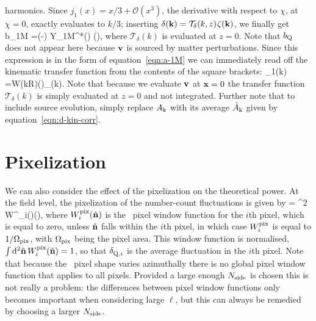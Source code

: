 harmonics.
Since $j_1(x)=x/3+\mathcal{O}(x^3)$, the derivative with respect to $\chi$, at $\chi=0$,
exactly evaluates to $k/3$; inserting $\delta(\mathbf{k})=\mathcal{T}_\delta(k,z)\hspace{0.06em}{\zeta}(\mathbf{k})$, we finally get
\be\nonumber
    b_{1M}
        =(-\im)\pi\int{}\:
            Y_{1M}^*(\hat\bk)
                \sp{\zeta}(\bk),
\ee
where $\mathcal{T}_\delta(k)$ is evaluated at $z=0$. Note that
$b_{\rm{Q}}$ does not appear here because $\mathbf{v}$ is sourced by
matter perturbations. Since this expression is in the form of equation~\eqref{eqn:a-1M} we can immediately
read off the kinematic transfer function from
the contents of the square brackets:
\be
    \Delta\Zu{\kin}_1(k)
        =\sp\ckin\sp W(kR)\sp\bigg(\bigg)\sp{}_\delta(k).
    \label{eqn:Delta-kin-1}
\ee
Note that because we evaluate $\mathbf{v}$ at $\mathbf{x}=0$ the 
transfer function $\mathcal{T}_\delta(k)$ is simply evaluated
at $z=0$ and not integrated. Further note that to
include source evolution,
simply replace $A_{\rm k}$ with its average $\bar{A}_{\rm k}$ 
given by equation~\eqref{eqn:d-kin-corr}.







\section{Pixelization}
We can also consider the effect of the pixelization on the theoretical power.
At the field level, the pixelization of the number-count fluctuations is given by
\be
    \delta{} = \int\dif^2\n\: W^_i(\n)\ssp \dqso(\n),
\ee
where $W^{\mathrm{pix}}_i(\hat{\mathbf{n}})$ is the \healpix\ pixel window function for the $i$th pixel,
which is equal to zero, unless $\hat{\mathbf{n}}$ falls within the $i$th pixel, in which case
$W^{\mathrm{pix}}_i$ is equal to $1/\Omega_{\rm pix}$, with $\Omega_{\rm pix}$ being the
pixel area. This window function is normalised,$\int\mathrm{d}^2\hat{\mathbf{n}}\,W^{\mathrm{pix}}_i(\hat{\mathbf{n}})=1$,
so that $\delta\Z{\qso,i}$ is the average fluctuation in the $i$th pixel.
Note that because the \healpix\ pixel shape varies azimuthally there is no global pixel window function
that applies to all pixels. Provided a large enough $N_{\mathrm{side}}$ is chosen this is not really a problem: the differences between pixel window functions
only becomes important when considering large $\ell$, but this can always be remedied by choosing
a larger $N_{\mathrm{side}}$.

